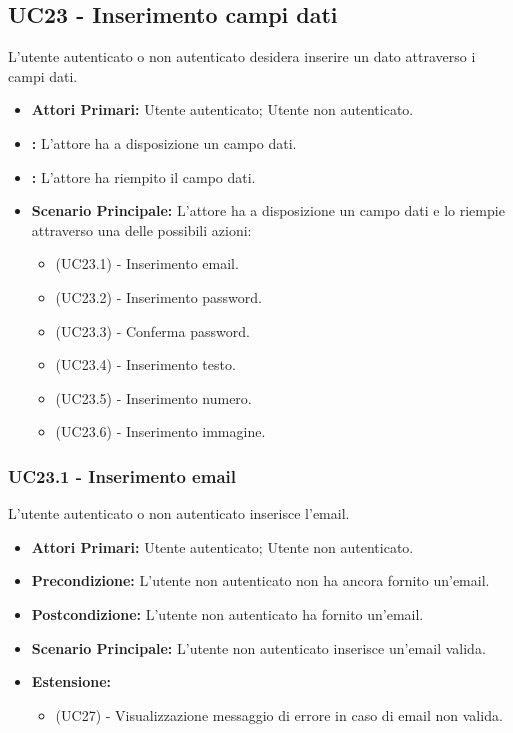 \subsection{UC23 - Inserimento campi dati}
\label{UC23}
L'utente autenticato o non autenticato desidera inserire un dato attraverso i campi dati.
\begin{itemize}
    \item \textbf{Attori Primari:} Utente autenticato; Utente non autenticato.
    \item \textbf{:} L'attore ha a disposizione un campo dati.
    \item \textbf{:} L'attore ha riempito il campo dati.
    \item \textbf{Scenario Principale:} L'attore ha a disposizione un campo dati e lo riempie attraverso una delle possibili azioni:
    \begin{itemize}
        \item (UC23.1) - Inserimento email.
        \item (UC23.2) - Inserimento password.
        \item (UC23.3) - Conferma password.
        \item (UC23.4) - Inserimento testo.
        \item (UC23.5) - Inserimento numero.
        \item (UC23.6) - Inserimento immagine.
    \end{itemize}
\end{itemize}

\subsubsection{UC23.1 - Inserimento email}
\label{UC23.1}
L'utente autenticato o non autenticato inserisce l'email.
\begin{itemize}
    \item \textbf{Attori Primari:} Utente autenticato; Utente non autenticato.
    \item \textbf{Precondizione:} L'utente non autenticato non ha ancora fornito un'email.
    \item \textbf{Postcondizione:} L'utente non autenticato ha fornito un'email.
    \item \textbf{Scenario Principale:} L'utente non autenticato inserisce un'email valida.
    \item \textbf{Estensione:}
    \begin{itemize}
        \item (UC27) - Visualizzazione messaggio di errore in caso di email non valida.
    \end{itemize}
\end{itemize}

